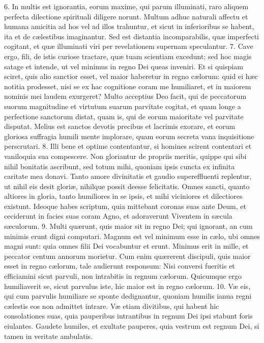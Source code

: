 \documentclass[twoside]{article}
\begin{document}
6. In multis est ignorantia, eorum maxime, qui parum illuminati, raro aliquem perfecta dilectione spirituali diligere norunt. Multum adhuc naturali affectu et humana amicitia ad hos vel ad illos trahuntur, et sicut in inferioribus se habent, ita et de cælestibus imaginantur. Sed est distantia incomparabilis, quæ imperfecti cogitant, et quæ illuminati viri per revelationem supernam speculantur.
7. Cave ergo, fili, de istis curiose tractare, quæ tuam scientiam excedunt; sed hoc magis satage et intende, ut vel minimus in regno Dei queas inveniri. Et si quispiam sciret, quis alio sanctior esset, vel maior haberetur in regno cælorum: quid ei hæc notitia prodesset, nisi se ex hac cognitione coram me humiliaret, et in maiorem nominis mei laudem exurgeret? Multo acceptius Deo facit, qui de peccatorum suorum magnitudine et virtutum suarum parvitate cogitat, et quam longe a perfectione sanctorum distat, quam is, qui de eorum maioritate vel parvitate disputat. Melius est sanctos devotis precibus et lacrimis exorare, et eorum gloriosa suffragia humili mente implorare, quam eorum secreta vana inquisitione perscrutari.
8. Illi bene et optime contentantur, si homines scirent contentari et vaniloquia sua compescere. Non gloriantur de propriis meritis, quippe qui sibi nihil bonitatis ascribunt, sed totum mihi, quoniam ipsis cuncta ex infinita caritate mea donavi. Tanto amore divinitatis et gaudio supereffluenti replentur, ut nihil eis desit gloriæ, nihilque possit deesse felicitatis. Omnes sancti, quanto altiores in gloria, tanto humiliores in se ipsis, et mihi viciniores et dilectiores existunt. Ideoque habes scriptum, quia mittebant coronas suas ante Deum, et ceciderunt in facies suas coram Agno, et adoraverunt Viventem in sæcula sæculorum.
9. Multi quærunt, quis maior sit in regno Dei; qui ignorant, an cum minimis erunt digni computari. Magnum est vel minimum esse in cælo, ubi omnes magni sunt: quia omnes filii Dei vocabuntur et erunt. Minimus erit in mille, et peccator centum annorum morietur. Cum enim quærerent discipuli, quis maior esset in regno cælorum, tale audierunt responsum: Nisi conversi fueritis et efficiamini sicut parvuli, non intrabitis in regnum cælorum. Quicumque ergo humiliaverit se, sicut parvulus iste, hic maior est in regno cælorum.
10. Væ eis, qui cum parvulis humiliare se sponte dedignantur, quoniam humilis ianua regni cælestis eos non admittet intrare. Væ etiam divitibus, qui habent hic consolationes suas, quia pauperibus intrantibus in regnum Dei ipsi stabunt foris eiulantes. Gaudete humiles, et exultate pauperes, quia vestrum est regnum Dei, si tamen in veritate ambulatis.
\end{document}
